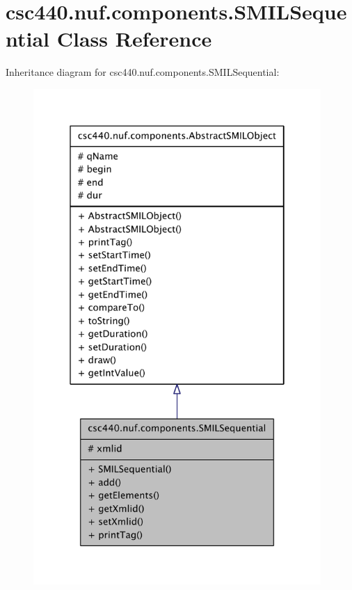 \hypertarget{classcsc440_1_1nuf_1_1components_1_1_s_m_i_l_sequential}{\section{csc440.\-nuf.\-components.\-S\-M\-I\-L\-Sequential Class Reference}
\label{classcsc440_1_1nuf_1_1components_1_1_s_m_i_l_sequential}
}


Inheritance diagram for csc440.\-nuf.\-components.\-S\-M\-I\-L\-Sequential\-:
\nopagebreak
\begin{figure}[H]
\begin{center}
\leavevmode
\includegraphics[width=310pt]{classcsc440_1_1nuf_1_1components_1_1_s_m_i_l_sequential__inherit__graph}
\end{center}
\end{figure}


